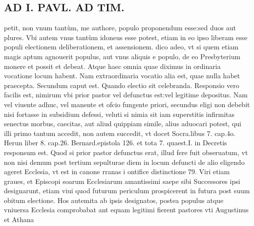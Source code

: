 \documentclass{article}
\begin{document}
\begin{pages}
\section*{AD I. PAVL. AD TIM. }\pstart petit, non vnum tantùm, me authore, populo proponendum esse:sed duos aut plures. Vbi autem vnus tantùm idoneus esse potest, etiam in eo ipso liberam esse populi electionem deliberationem, et assensionem. dico adeo, vt si quem etiam magis aptum agnouerit populus, aut vnus aliquis e populo, de eo Presbyterium monere et possit et debeat. Atque  haec omnia quae diximus in ordinaria vocatione locum habent. Nam extraordinaria vocatio alia est, quae nulla habet praecepta.  \pend\pstart Secundum caput est. Quando electio sit celebranda. Responsio vero facilis est, nimirum vbi prior pastor vel defunctus est:vel legitime depositus. Nam vel viuente adhuc, vel manente et ofcio fungente priori, secundus eligi non debebit nisi fortasse in subsidium defessi, veluti si nimia sit iam superstitis infirmitas senectus morbus, caecitas, aut aliud quippiam simile, alius aduocari potest, qui illi primo tantum accedit, non autem succedit, vt docet Socra.libus 7. cap.4o. Herun liber  8. cap.26. Bernard.epistola 126. et tota 7. quaest.I. in Decretis responsum est. Quod si prior pastor defunctus erat, illud fere fuit obseruatum, vt non nisi demum post tertium sepulturae diem in locum defuncti de alio eligendo ageret Ecclesia, vt est in canone rranas i ontifice distinctione 79. Viri etiam graues, et Episcopi soarum Ecclesiarum amantissimi saepe sibi Successores ipsi designarunt, etiam viui quod futurum periculum prospicerent in futura post suum obitum electione. Hos autemita ab ipsis designatos, postea populus atque vniuersa Ecclesia comprobabat ant equam legitimi fierent pastores vti Augustinus et Athana\pend

\end{pages}
\end{document}
